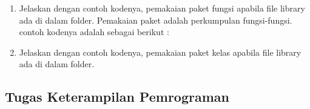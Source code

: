\begin{enumerate}
	\item Jelaskan dengan contoh kodenya, pemakaian paket fungsi apabila file library ada di dalam folder.\newline
	Pemakaian paket adalah perkumpulan fungsi-fungsi. contoh kodenya adalah sebagai berikut :
	
	
	\item Jelaskan dengan contoh kodenya, pemakaian paket kelas apabila file library ada
	di dalam folder.\newline
	
\end{enumerate}

\subsection{Tugas Keterampilan Pemrograman}
